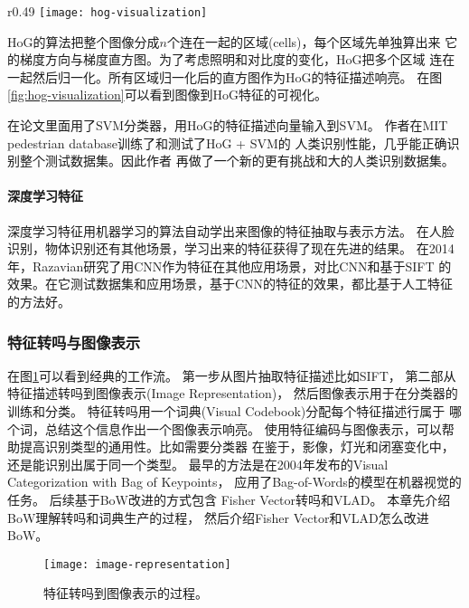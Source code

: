 \begin{wrapfigure}{r}{0.49\textwidth}
  \centering
    \captionsetup{justification=centering}
    \texttt{[image: hog-visualization]}
    \caption{可视化HOG的特征描述。\\
             源：Cornell CS4670}
  \label{fig:hog-visualization}
\end{wrapfigure}
HoG的算法把整个图像分成$n$个连在一起的区域(cells)，每个区域先单独算出来
它的梯度方向与梯度直方图。为了考虑照明和对比度的变化，HoG把多个区域
连在一起然后归一化。所有区域归一化后的直方图作为HoG的特征描述响亮。
在图\ref{fig:hog-visualization}可以看到图像到HoG特征的可视化。

在论文里面用了SVM分类器，用HoG的特征描述向量输入到SVM。
作者在MIT pedestrian database训练了和测试了HoG + SVM的
人类识别性能，几乎能正确识别整个测试数据集。因此作者
再做了一个新的更有挑战和大的人类识别数据集。


\paragraph{深度学习特征}
深度学习特征用机器学习的算法自动学出来图像的特征抽取与表示方法。
在人脸识别，物体识别还有其他场景，学习出来的特征获得了现在先进的结果。
\cite{taigman2014deepface, krizhevsky2012imagenet}
在2014年，Razavian研究了用CNN作为特征在其他应用场景，对比CNN和基于SIFT
的效果。在它测试数据集和应用场景，基于CNN的特征的效果，都比基于人工特征的方法好。
\cite{razavian2014cnn}




\subsubsection{特征转吗与图像表示}
\label{subsubsec:feature-encoding}
在图\ref{fig:image-representation}可以看到经典的工作流。
第一步从图片抽取特征描述比如SIFT，
第二部从特征描述转吗到图像表示(Image Representation)，
然后图像表示用于在分类器的训练和分类。
特征转吗用一个词典(Visual Codebook)分配每个特征描述行属于
哪个词，总结这个信息作出一个图像表示响亮。
使用特征编码与图像表示，可以帮助提高识别类型的通用性。比如需要分类器
在鉴于，影像，灯光和闭塞变化中，还是能识别出属于同一个类型。
最早的方法是在2004年发布的Visual Categorization with Bag of Keypoints，
应用了Bag-of-Words的模型在机器视觉的任务。\cite{csurka2004visual}
后续基于BoW改进的方式包含 Fisher Vector转吗和VLAD。
\cite{perronnin2007fisher,jegou2010vlad}本章先介绍BoW理解转吗和词典生产的过程，
然后介绍Fisher Vector和VLAD怎么改进BoW。
\begin{figure}
  \centering
    \texttt{[image: image-representation]}
    \caption{特征转吗到图像表示的过程。}
  \label{fig:image-representation}
\end{figure}

